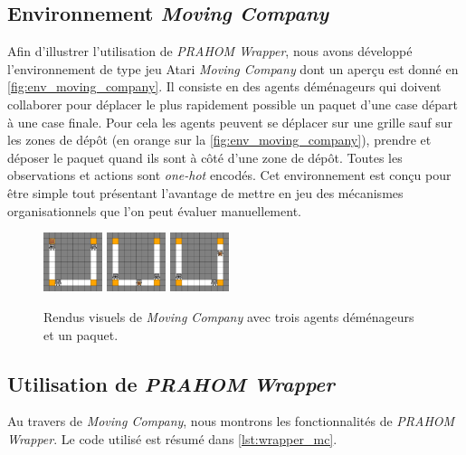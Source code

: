 \documentclass[demonstration]{jfsma}
\begin{document}
\subsection{Environnement \emph{Moving Company}}

Afin d'illustrer l'utilisation de \emph{PRAHOM Wrapper}, nous avons développé l'environnement de type jeu Atari \emph{Moving Company} dont un aperçu est donné en \autoref{fig:env_moving_company}. Il consiste en des agents déménageurs qui doivent collaborer pour déplacer le plus rapidement possible un paquet d'une case départ à une case finale. Pour cela les agents peuvent se déplacer sur une grille sauf sur les zones de dépôt (en orange sur la \autoref{fig:env_moving_company}), prendre et déposer le paquet quand ils sont à côté d'une zone de dépôt. Toutes les observations et actions sont \emph{one-hot} encodés. Cet environnement est conçu pour être simple tout présentant l'avantage de mettre en jeu des mécanismes organisationnels que l'on peut évaluer manuellement.

\begin{figure}[h!]
  \centering
  \includegraphics[width=0.154\textwidth]{figures/moving_company_1.png}
  \includegraphics[width=0.154\textwidth]{figures/moving_company_2.png}
  \includegraphics[width=0.154\textwidth]{figures/moving_company_3.png}
  \caption{Rendus visuels de \emph{Moving Company} avec trois agents déménageurs et un paquet.}
  \label{fig:env_moving_company}
\end{figure}

\subsection{Utilisation de \emph{PRAHOM Wrapper}}

Au travers de \emph{Moving Company}, nous montrons les fonctionnalités de \emph{PRAHOM Wrapper}. Le code utilisé est résumé dans \autoref{lst:wrapper_mc}.
\end{document}
